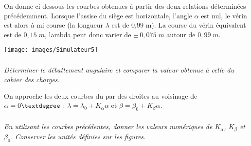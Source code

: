 \documentclass[10pt]{article}
\newif\ifprof
\begin{document}
\else
\fi

\ifprof
\else
On donne ci-dessous les courbes obtenues à partir des deux relations
déterminées précédemment. Lorsque l’assise du siège est horizontale, l’angle $\alpha$ est nul, le vérin
est alors à mi course (la longueur $\lambda$ est de 0,99 m). La course du vérin équivalent est de $0,15\; m$,
lambda peut donc varier de $\pm\, 0,075\;m$ autour de $0,99\; m$. 

\begin{center}
\texttt{[image: images/Simulateur5]}
\end{center}
\fi

\subparagraph{}
\textit{Déterminer le débattement angulaire et comparer la valeur obtenue à celle du cahier des charges.}
\ifprof
\begin{corrige}
Lorsque $\lambda$ varie de 0,0915 m à 1,065 m, $\alpha$ varie de -9 degrés à +9 degrés. Le cahier des charges imposant un débattement de $\pm$ 15 degrés, le cahier des charges n'est donc pas vérifié. 
\end{corrige}
\else
\fi


On approche les deux courbes du par des droites au voisinage de $\alpha=0\textdegree$ : 
$\lambda = \lambda_0+K_\alpha \alpha$ et 
$\beta = \beta_0+K_\beta \alpha$.

\subparagraph{}
\textit{En utilisant les courbes précédentes, donner les valeurs numériques de $K_\alpha$, $K_\beta$ et $\beta_0$. Conserver les unités définies sur les figures.}
\ifprof
\begin{corrige}
En traçant les deux courbes sur Excel et en faisant une regression linéaire on obtient la figure suivante :
\begin{center}
\texttt{[image: images/Courbes.png]}
\end{center}

On a donc en faisant afficher les coefficients : 
\begin{itemize}
\item $\lambda_0 = 0,9849\; m$;
\item $K_\alpha = 0,0086\; m/\text{\textdegree}$;
\item $\beta_0 = -45 \text{\textdegree}$:
\item $K_\beta = 0,5 $.
\end{itemize}
\end{corrige}
\else
\fi
\end{document}
